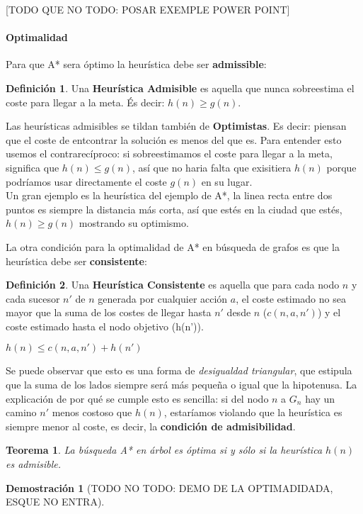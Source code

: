 \documentclass[12pt,a4paper,catalan, leqno]{article} %
\theoremstyle{definition}
\newtheorem{defn}{Definición}[section]
\newtheorem*{tm}{Teorema}
\newtheorem*{demo}{Demostración}
\begin{document}
[TODO QUE NO TODO: POSAR EXEMPLE POWER POINT]

\paragraph{Optimalidad}

Para que A* sera óptimo la heurística debe ser \textbf{admissible}:

\begin{defn}
Una \textbf{Heurística Admisible} es aquella que nunca sobreestima el coste para llegar a la meta. És decir: $h(n) \geq g(n)$.
\end{defn}

Las heurísticas admisibles se tildan también de \textbf{Optimistas}. Es decir: piensan que el coste de entcontrar la solución es menos del que es. Para entender esto usemos el contrarecíproco: si sobreestimamos el coste para llegar a la meta, significa que $h(n) \leq g(n)$, así que no haria falta que exisitiera $h(n)$ porque podríamos usar directamente el coste $g(n)$ en su lugar.\\
Un gran ejemplo es la heurística del ejemplo de A*, la linea recta entre dos puntos es siempre la distancia más corta, así que estés en la ciudad que estés, $h(n) \geq g(n)$ mostrando su optimismo.

La otra condición para la optimalidad de A* en búsqueda de grafos es que la heurística debe ser \textbf{consistente}:

\begin{defn}
Una \textbf{Heurística Consistente} es aquella que para cada nodo $n$ y cada sucesor $n'$ de $n$ generada por cualquier acción $a$, el coste estimado no sea mayor que la suma de los costes de llegar hasta $n'$ desde $n$ ($c(n,a,n')$) y el coste estimado hasta el nodo objetivo (h(n')).
\begin{center}
    $h(n) \leq c(n,a,n') + h(n')$
\end{center}
\end{defn}

Se puede observar que esto es una forma de \textit{desigualdad triangular}, que estipula que la suma de los lados siempre será más pequeña o igual que la hipotenusa. La explicación de por qué se cumple esto es sencilla: si del nodo $n$ a $G_n$ hay un camino $n'$ menos costoso que $h(n)$, estaríamos violando que la heurística es siempre menor al coste, es decir, la \textbf{condición de admisibilidad}.

\begin{tm}
\textit{La búsqueda A* en árbol es óptima si y sólo si la heurística $h(n)$ es admisible.}

\begin{demo}
[TODO NO TODO: DEMO DE LA OPTIMADIDADA, ESQUE NO ENTRA]
\end{demo}
\end{tm}
\end{document}

